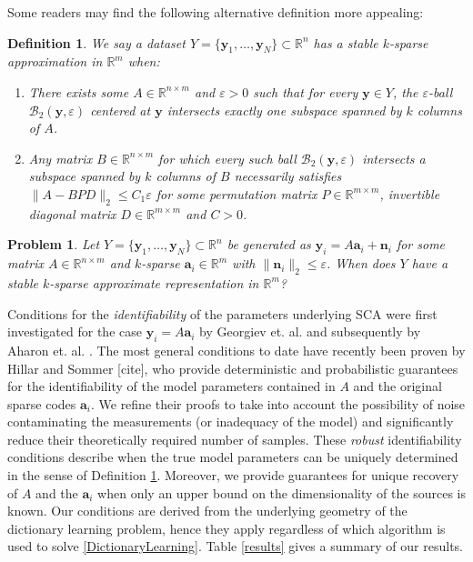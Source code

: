 \documentclass[journal, onecolumn]{IEEEtran}
\newtheorem{problem}{Problem}
\newtheorem{definition}{Definition}
\begin{document}
Some readers may find the following alternative definition more appealing:

\begin{definition}\label{Uniqueness}
We say a dataset $Y = \{\mathbf{y}_1, \ldots, \mathbf{y}_N\} \subset \mathbb{R}^n$ has a stable $k$-sparse approximation in $\mathbb{R}^m$ when:
\begin{enumerate}
\item There exists some $A \in \mathbb{R}^{n \times m}$ and $\varepsilon > 0$ such that for every $\mathbf{y} \in Y$, the $\varepsilon$-ball $\mathcal{B}_2(\mathbf{y}, \varepsilon)$ centered at $\mathbf{y}$ intersects exactly one subspace spanned by $k$ columns of $A$.
\item Any matrix $B \in \mathbb{R}^{n \times m}$ for which every such ball $\mathcal{B}_2(\mathbf{y}, \varepsilon)$ intersects a subspace spanned by $k$ columns of $B$ necessarily satisfies $\|A - BPD\|_2 \leq C_1\varepsilon$ for some permutation matrix $P \in \mathbb{R}^{m \times m}$, invertible diagonal matrix $D \in \mathbb{R}^{m \times m}$ and $C > 0$.
\end{enumerate}
\end{definition}

\begin{problem}\label{DUTproblem}
Let $Y = \{\mathbf{y}_1, \ldots, \mathbf{y}_N \} \subset \mathbb{R}^n$ be generated as $\mathbf{y}_i = A\mathbf{a}_i  + \mathbf{n}_i$ for some matrix $A \in \mathbb{R}^{n \times m}$ and $k$-sparse $\mathbf{a}_i \in \mathbb{R}^m$ with $\|\mathbf{n}_i\|_2 \leq \varepsilon$. When does $Y$ have a stable $k$-sparse approximate representation in $\mathbb{R}^m$?
\end{problem}

Conditions for the \emph{identifiability} of the parameters underlying SCA were first investigated for the case $\mathbf{y}_i = A\mathbf{a}_i$ by Georgiev et. al. \cite{Georgiev05} and subsequently by Aharon et. al. \cite{Aharon06}. The most general conditions to date have recently been proven by Hillar and Sommer [cite], who provide deterministic and probabilistic guarantees for the identifiability of the model parameters contained in $A$ and the original sparse codes $\mathbf{a}_i$. We refine their proofs to take into account the possibility of noise contaminating the measurements (or inadequacy of the model) and significantly reduce their theoretically required number of samples. These \emph{robust} identifiability conditions describe when the true model parameters can be uniquely determined in the sense of Definition \ref{Uniqueness}. Moreover, we provide guarantees for unique recovery of $A$ and the $\mathbf{a}_i$ when only an upper bound on the dimensionality of the sources is known. Our conditions are derived from the underlying geometry of the dictionary learning problem, hence they apply regardless of which algorithm is used to solve \eqref{DictionaryLearning}. Table \ref{results} gives a summary of our results.
\end{document}
